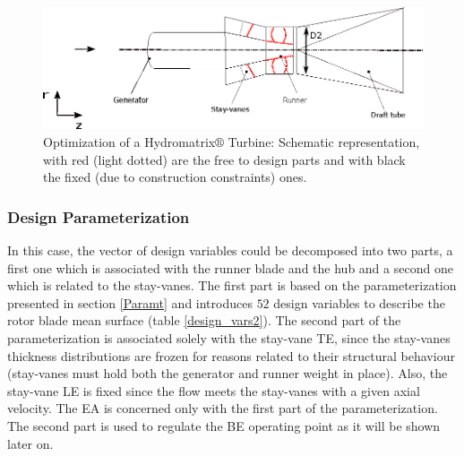 \begin{figure}[h!]
\centering
\includegraphics[width=120mm]{gen_turb.eps}    
\caption{Optimization of a Hydromatrix$\circledR$ Turbine: Schematic representation, with red (light dotted) are the free to design parts and with black the fixed (due to construction constraints) ones.  }
\label{Matrix_b}
\end{figure}

\subsubsection{Design Parameterization}
In this case, the vector of design variables could be decomposed into two parts, a first one which is associated with the runner blade and the hub and a second one which is related to the stay-vanes. The first part is based on the parameterization presented in section \ref{Paramt} and introduces $52$ design variables to describe the rotor blade mean surface (table \ref{design_vars2}). The second part of the parameterization is associated solely with the stay-vane TE, since the stay-vanes thickness distributions are frozen for reasons related to their structural behaviour (stay-vanes must hold both the generator and runner weight in place). Also, the stay-vane LE is fixed since the flow meets the stay-vanes with a given axial velocity.  The EA is concerned only with the first part of the parameterization. The second part is used to regulate the BE operating point as it will be shown later on.      

